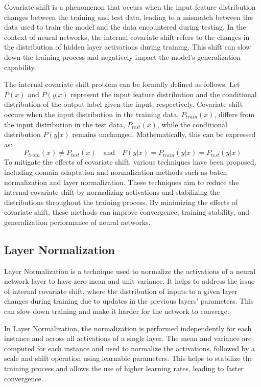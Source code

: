 \documentclass[12pt]{article}
\begin{document}
Covariate shift is a phenomenon that occurs when the input feature distribution changes between the training and test data, leading to a mismatch between the data used to train the model and the data encountered during testing. In the context of neural networks, the internal covariate shift refers to the changes in the distribution of hidden layer activations during training. This shift can slow down the training process and negatively impact the model's generalization capability.

The internal covariate shift problem can be formally defined as follows. Let $P(x)$ and $P(y|x)$ represent the input feature distribution and the conditional distribution of the output label given the input, respectively. Covariate shift occurs when the input distribution in the training data, $P_{train}(x)$, differs from the input distribution in the test data, $P_{test}(x)$, while the conditional distribution $P(y|x)$ remains unchanged. Mathematically, this can be expressed as:
\begin{equation}
P_{train}(x) \neq P_{test}(x) \quad \text{and} \quad P(y|x) = P_{train}(y|x) = P_{test}(y|x)
\end{equation}
To mitigate the effects of covariate shift, various techniques have been proposed, including domain adaptation and normalization methods such as batch normalization and layer normalization. These techniques aim to reduce the internal covariate shift by normalizing activations and stabilizing the distributions throughout the training process. By minimizing the effects of covariate shift, these methods can improve convergence, training stability, and generalization performance of neural networks.

\subsection{Layer Normalization}
Layer Normalization is a technique used to normalize the activations of a neural network layer to have zero mean and unit variance. It helps to address the issue of internal covariate shift, where the distribution of inputs to a given layer changes during training due to updates in the previous layers' parameters. This can slow down training and make it harder for the network to converge.

In Layer Normalization, the normalization is performed independently for each instance and across all activations of a single layer. The mean and variance are computed for each instance and used to normalize the activations, followed by a scale and shift operation using learnable parameters. This helps to stabilize the training process and allows the use of higher learning rates, leading to faster convergence.
\end{document}
